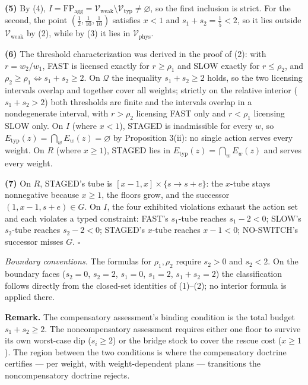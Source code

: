 \documentclass[11pt]{article}
\begin{document}
\textbf{(5)} By (4),
\(I = \mathrm{FP}_{\mathrm{agg}} = \mathcal{V}_{\mathrm{weak}} \setminus \mathcal{V}_{\mathrm{typ}} \neq \varnothing\),
so the first inclusion is strict. For the second, the point
\((\tfrac12, \tfrac1{10}, \tfrac1{10})\) satisfies \(x < 1\) and
\(s_1 + s_2 = \tfrac15 < 2\), so it lies outside
\(\mathcal{V}_{\mathrm{weak}}\) by (2), while by (3) it lies in
\(\mathcal{V}_{\mathrm{phys}}\).

\textbf{(6)} The threshold characterization was derived in the proof of
(2): with \(r = w_2 / w_1\), FAST is licensed exactly for
\(r \ge \rho_1\) and SLOW exactly for \(r \le \rho_2\), and
\(\rho_2 \ge \rho_1 \iff s_1 + s_2 \ge 2\). On \(\mathcal{Q}\) the
inequality \(s_1 + s_2 \ge 2\) holds, so the two licensing intervals
overlap and together cover all weights; strictly on the relative
interior (\(s_1 + s_2 > 2\)) both thresholds are finite and the
intervals overlap in a nondegenerate interval, with \(r > \rho_2\)
licensing FAST only and \(r < \rho_1\) licensing SLOW only. On \(I\)
(where \(x < 1\)), STAGED is inadmissible for every \(w\), so
\(E_{\mathrm{typ}}(z) = \bigcap_w E_w(z) = \varnothing\) by Proposition
3(ii): no single action serves every weight. On \(R\) (where
\(x \ge 1\)), STAGED lies in \(E_{\mathrm{typ}}(z) = \bigcap_w E_w(z)\)
and serves every weight.

\textbf{(7)} On \(R\), STAGED's tube is
\([x - 1, x] \times \{s \to s + e\}\): the \(x\)-tube stays nonnegative
because \(x \ge 1\), the floors grow, and the successor
\((1, x - 1, s + e) \in G\). On \(I\), the four exhibited violations
exhaust the action set and each violates a typed constraint: FAST's
\(s_1\)-tube reaches \(s_1 - 2 < 0\); SLOW's \(s_2\)-tube reaches
\(s_2 - 2 < 0\); STAGED's \(x\)-tube reaches \(x - 1 < 0\); NO-SWITCH's
successor misses \(G\). \ensuremath{\square}

\emph{Boundary conventions.} The formulas for \(\rho_1, \rho_2\) require
\(s_2 > 0\) and \(s_2 < 2\). On the boundary faces (\(s_2 = 0\),
\(s_2 = 2\), \(s_1 = 0\), \(s_1 = 2\), \(s_1 + s_2 = 2\)) the
classification follows directly from the closed-set identities of
(1)--(2); no interior formula is applied there.

\textbf{Remark.} The compensatory assessment's binding condition is the
total budget \(s_1 + s_2 \ge 2\). The noncompensatory assessment requires either one floor to survive its own worst-case dip (\(s_i \ge 2\)) or the bridge stock to cover the rescue cost (\(x \ge 1\)). The region between the two conditions is
where the compensatory doctrine certifies --- per weight, with
weight-dependent plans --- transitions the noncompensatory doctrine
rejects.
\end{document}
